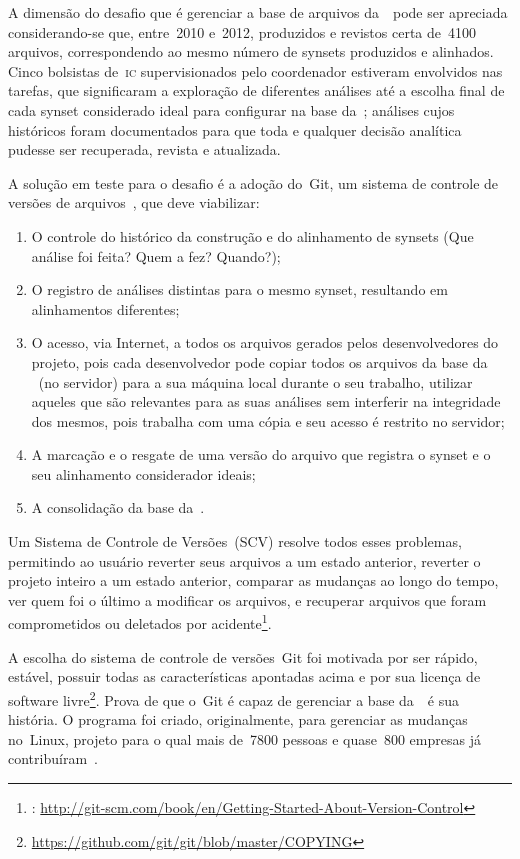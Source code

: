 A dimensão do desafio que é gerenciar a base de arquivos da~\wnbr\ pode ser
apreciada considerando-se que, entre~2010 e~2012, produzidos e revistos certa
de~4100 arquivos, correspondendo ao mesmo número de synsets produzidos e
alinhados. Cinco bolsistas de~\textsc{ic} supervisionados pelo coordenador
estiveram envolvidos nas tarefas, que significaram a exploração de diferentes
análises até a escolha final de cada synset considerado ideal para configurar
na base da~\wnbr; análises cujos históricos foram documentados para que toda e
qualquer decisão analítica pudesse ser recuperada, revista e atualizada.

A solução em teste para o desafio é a adoção do~Git, um sistema de controle de
versões de arquivos~\cite{chacon}, que deve viabilizar:

\begin{enumerate}
  \item O controle do histórico da construção e do alinhamento de synsets (Que
    análise foi feita? Quem a fez? Quando?);
  \item O registro de análises distintas para o mesmo synset, resultando em
    alinhamentos diferentes;
  \item O acesso, via Internet, a todos os arquivos gerados pelos
    desenvolvedores do projeto, pois cada desenvolvedor pode copiar todos os
    arquivos da base da \wnbr\ (no servidor) para a sua máquina local durante o
    seu trabalho, utilizar aqueles que são relevantes para as suas análises sem
    interferir na integridade dos mesmos, pois trabalha com uma cópia e seu
    acesso é restrito no servidor;
  \item A marcação e o resgate de uma versão do arquivo que registra o synset e
    o seu alinhamento considerador ideais;
  \item A consolidação da base da~\wnbr.
\end{enumerate}

Um Sistema de Controle de Versões~(SCV) resolve todos esses problemas,
permitindo ao usuário reverter seus arquivos a um estado anterior, reverter o
projeto inteiro a um estado anterior, comparar as mudanças ao longo do tempo,
ver quem foi o último a modificar os arquivos, e recuperar arquivos que foram
comprometidos ou deletados por acidente\footnote{:
\url{http://git-scm.com/book/en/Getting-Started-About-Version-Control}}.

A escolha do sistema de controle de versões~Git foi motivada por ser rápido,
estável, possuir todas as características apontadas acima e por sua licença de
software livre\footnote{\url{https://github.com/git/git/blob/master/COPYING}}.
Prova de que o~Git é capaz de gerenciar a base da~\wnbr\ é sua história. O
programa foi criado, originalmente, para gerenciar as mudanças no~Linux,
projeto para o qual mais de~7800 pessoas e quase~800 empresas já
contribuíram~\cite[p.~1]{corbetetal}.

